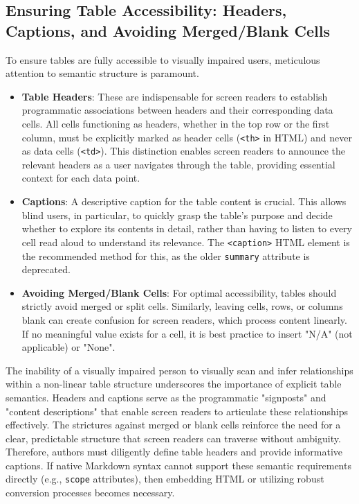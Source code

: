 \subsection{Ensuring Table Accessibility: Headers, Captions, and Avoiding Merged/Blank Cells}
To ensure tables are fully accessible to visually impaired users, meticulous attention to semantic structure is paramount.
\begin{itemize}
    \item \textbf{Table Headers}: These are indispensable for screen readers to establish programmatic associations between headers and their corresponding data cells.\cite{MDNTableAccess,OSUDigitalAccess,DSU} All cells functioning as headers, whether in the top row or the first column, must be explicitly marked as header cells (\texttt{<th>} in HTML) and never as data cells (\texttt{<td>}).\cite{MDNTableAccess,OSUDigitalAccess} This distinction enables screen readers to announce the relevant headers as a user navigates through the table, providing essential context for each data point.\cite{MDNTableAccess,OSUDigitalAccess}
    \item \textbf{Captions}: A descriptive caption for the table content is crucial.\cite{MDNTableAccess} This allows blind users, in particular, to quickly grasp the table's purpose and decide whether to explore its contents in detail, rather than having to listen to every cell read aloud to understand its relevance.\cite{MDNTableAccess} The \texttt{<caption>} HTML element is the recommended method for this, as the older \texttt{summary} attribute is deprecated.\cite{MDNTableAccess}
    \item \textbf{Avoiding Merged/Blank Cells}: For optimal accessibility, tables should strictly avoid merged or split cells.\cite{DSU} Similarly, leaving cells, rows, or columns blank can create confusion for screen readers, which process content linearly.\cite{DSU,MDNTableAccess} If no meaningful value exists for a cell, it is best practice to insert "N/A" (not applicable) or "None".\cite{DSU,GitLabDocs}
\end{itemize}
The inability of a visually impaired person to visually scan and infer relationships within a non-linear table structure underscores the importance of explicit table semantics. Headers and captions serve as the programmatic "signposts" and "content descriptions" that enable screen readers to articulate these relationships effectively. The strictures against merged or blank cells reinforce the need for a clear, predictable structure that screen readers can traverse without ambiguity. Therefore, authors must diligently define table headers and provide informative captions. If native Markdown syntax cannot support these semantic requirements directly (e.g., \texttt{scope} attributes), then embedding HTML or utilizing robust conversion processes becomes necessary.

